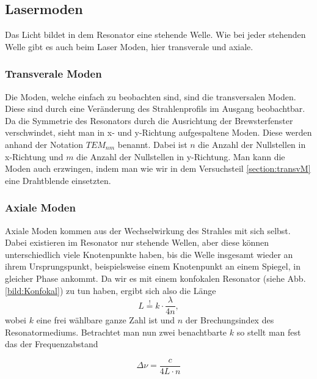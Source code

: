 
\subsection{Lasermoden}
\label{subs:moden}

Das Licht bildet in dem Resonator eine stehende Welle. Wie bei jeder stehenden Welle gibt es 
auch beim Laser Moden, hier transverale und axiale.

\subsubsection{Transverale Moden}

Die Moden, welche einfach zu beobachten sind, sind die transversalen Moden. Diese sind durch eine Veränderung des
Strahlenprofils im Ausgang beobachtbar. Da die Symmetrie des Resonators durch die 
Ausrichtung der Brewsterfenster verschwindet, sieht man in x- und y-Richtung aufgespaltene Moden. Diese werden anhand der Notation $TEM_{nm}$ benannt.
Dabei ist $n$ die Anzahl der Nullstellen in x-Richtung und $m$ die Anzahl der Nullstellen in y-Richtung. Man kann die Moden auch
erzwingen, indem man wie wir in dem Versuchsteil \ref{section:transvM} eine Drahtblende einsetzten.


\subsubsection{Axiale Moden}

Axiale Moden kommen aus der Wechselwirkung des Strahles mit sich selbst.
Dabei existieren im Resonator nur stehende Wellen, aber diese können unterschiedlich viele Knotenpunkte haben, bis 
die Welle insgesamt wieder an ihrem Ursprungspunkt, beispielsweise einem Knotenpunkt an einem Spiegel, in gleicher Phase ankommt. Da wir es mit einem konfokalen Resonator (siehe Abb.\ref{bild:Konfokal}) zu tun haben,
ergibt sich also die Länge 
\begin{equation}
    L \overset{!}{=} k \cdot \frac{\lambda}{4n},
\end{equation}
wobei $k$ eine frei wählbare ganze Zahl ist und $n$ der Brechungsindex des Resonatormediums.
Betrachtet man nun zwei benachtbarte $k$ so stellt man fest das der Frequenzabstand 

\begin{equation}
    \Delta \nu = \frac{c}{4L\cdot n}
    \label{eq:FSR}
\end{equation}

